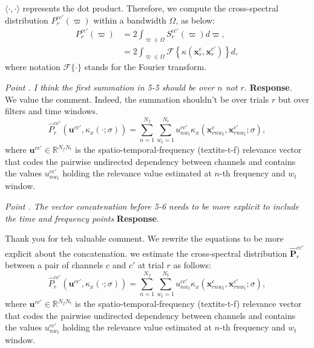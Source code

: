 \documentclass[runningheads]{llncs}
\newcommand{\Real}{\mathbb{R}}
\newcommand{\ve}[1]{\bm {#1}}
\newcommand{\mat}[1]{\bm {#1}}
\newenvironment{reviewer}{\setcounter{pointcounter}{1}}{}
\newcommand{\changes}[1]{\textcolor[rgb]{1.00,0.00,0.00}{#1}}
\newcommand{\point}[1]{\medskip \noindent
  \textsl{{\fontseries{b}\selectfont Point \thepointcounter}.
\stepcounter{pointcounter} #1}}
\newcommand{\reply}{\medskip \noindent \textbf{Response}.\ }
\begin{document}
\begin{reviewer}
{{      $\langle \cdot,\cdot \rangle$ represents the dot product.
      Therefore, we compute the cross-spectral distribution $
      P^{cc'}_{r}(\varpi)$ within a bandwidth $\varOmega$, as below:
      \begin{equation}
        \begin{aligned}\label{eq:CSDist}
          P^{cc'}_{r}(\varpi) &= 2\int_{\varpi \in \varOmega}
          S^{cc'}_{r}(\varpi)d\varpi,\\
          &=2\int_{\varpi \in \varOmega}
          \mathscr{F}\left\{\kappa(\ve{x}^{c}_{r},\ve{x}^{c'}_{r}) \right\}d,
        \end{aligned}
      \end{equation}
      where notation $\mathscr{F}\{\cdot\}$ stands for the Fourier transform.
    }
  }

  \point{I think the first summation in 5-5 should be over $n$ not $r$.}
  \reply{
    We value the comment. Indeed, the summation shouldn't be over
    trials $r$ but over filters and time windows.
    \changes{
      \begin{equation}\label{eq:fcc}
        \hat{P}^{cc'}_{r}(\ve{u}^{cc'},\kappa_x\left(\cdot;\sigma\right))
        = \sum_{n=1}^{N_f}\sum_{w_t=1}^{N_t}
        u_{nw_t}^{cc'}\kappa_x\left(\ve{x}^{c}_{rnw_t},\ve{x}^{c'}_{rnw_t};\sigma\right),
      \end{equation}
      where $\ve{u}^{cc'} \in \Real^{N_f N_t}$ is the
      spatio-temporal-frequency (textit{s-t-f}) relevance vector that
      codes the pairwise undirected dependency between channels and
      contains the values $u_{nw_t}^{cc'}$ holding the relevance
      value estimated at $n$-th frequency and $w_t$ window.
    }
  }

  \point{The vector concatenation before 5-6 needs to be more
  explicit to include the time and frequency points}
  \reply{
    Thank you for teh valuable comment. We rewrite the equations to
    be more explicit about the concatenation.
    \changes{we estimate the cross-spectral distribution
      $\hat{\mat{P}}^{cc'}_{r}$ between a pair of channels $c$ and $c'$
    at trial $r$ as follows:}
    \changes{
      \begin{equation}\label{eq:fcc}
        \hat{P}^{cc'}_{r}(\ve{u}^{cc'},\kappa_x\left(\cdot;\sigma\right))
        = \sum_{n=1}^{N_f}\sum_{w_t=1}^{N_t}
        u_{nw_t}^{cc'}\kappa_x\left(\ve{x}^{c}_{rnw_t},\ve{x}^{c'}_{rnw_t};\sigma\right),
      \end{equation}
      where $\ve{u}^{cc'} \in \Real^{N_f N_t}$ is the
      spatio-temporal-frequency (textit{s-t-f}) relevance vector that
      codes the pairwise undirected dependency between channels and
      contains the values $u_{nw_t}^{cc'}$ holding the relevance
      value estimated at $n$-th frequency and $w_t$ window.
    }

}
\end{reviewer}
\end{document}
